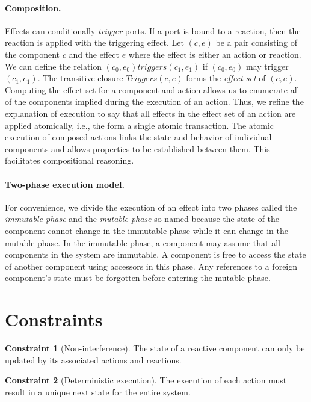 \documentclass[letterpaper]{article}
\theoremstyle{definition} \newtheorem{constraint}{Constraint}
\begin{document}
\paragraph{Composition.}
Effects can conditionally \emph{trigger} ports.
If a port is bound to a reaction, then the reaction is applied with the triggering effect.
Let $(c,e)$ be a pair consisting of the component $c$ and the effect $e$ where the effect is either an action or reaction.
We can define the relation $(c_0, e_0) triggers (c_1, e_1)$ if $(c_0, e_0)$ may trigger $(c_1, e_1)$.
The transitive closure $Triggers(c,e)$ forms the \emph{effect set} of $(c,e)$.
Computing the effect set for a component and action allows us to enumerate all of the components implied during the execution of an action.
Thus, we refine the explanation of execution to say that all effects in the effect set of an action are applied atomically, i.e., the form a single atomic transaction.
The atomic execution of composed actions links the state and behavior of individual components and allows properties to be established between them.
This facilitates compositional reasoning.

\paragraph{Two-phase execution model.}
For convenience, we divide the execution of an effect into two phases called the \emph{immutable phase} and the \emph{mutable phase} so named because the state of the component cannot change in the immutable phase while it can change in the mutable phase.
In the immutable phase, a component may assume that all components in the system are immutable.
A component is free to access the state of another component using accessors in this phase.
Any references to a foreign component's state must be forgotten before entering the mutable phase.

\section{Constraints\label{constraints}}

\begin{constraint}[Non-interference]
The state of a reactive component can only be updated by its associated actions and reactions.
\end{constraint}

\begin{constraint}[Deterministic execution]
The execution of each action must result in a unique next state for the entire system.
\end{constraint}
\end{document}
